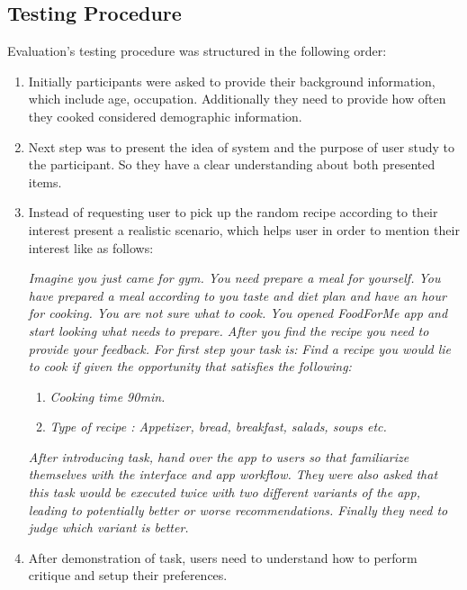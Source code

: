 \subsection {Testing Procedure}
Evaluation's testing procedure was structured in the following order:
 \begin{enumerate}
 	
 	\item  Initially participants were asked to provide their background information, which include age, occupation. Additionally they need to provide how often they cooked considered demographic information.
 	
 	\item Next step was to present the idea of system and the purpose of user study to the participant. So they have a clear understanding about both presented items.  
 	
 	\item Instead of requesting user to pick up the random recipe according to their interest present a realistic scenario, which helps user in order to mention their interest like as follows:\newline 
 	
 	\textit{Imagine you just came for gym. You need prepare a meal for yourself. You have prepared a meal according to you taste and diet plan and have an hour for cooking.  You are not sure what to cook. You opened FoodForMe app and start looking what needs to prepare. After you find the recipe you need to provide your feedback.}\newline
 	\textit{For first step your task is:}\newline
 	\textit{Find a recipe you would lie to cook if given the opportunity that satisfies the following:}
 	\begin{enumerate}
	 	\item \textit{Cooking time 90min.}
	 	\item \textit{Type of recipe : Appetizer,  bread, breakfast, salads, soups etc.}
 	\end{enumerate}
 	\textit{After introducing task, hand over the app to users so that familiarize themselves with the interface and app workflow. They were also asked that this task would be executed twice with two different variants of the app, leading to potentially better or worse recommendations. Finally they need to judge which variant is better.}
 	
 	\item After demonstration of task, users need to understand how to perform critique and setup their preferences. 
 	

\end{enumerate}
